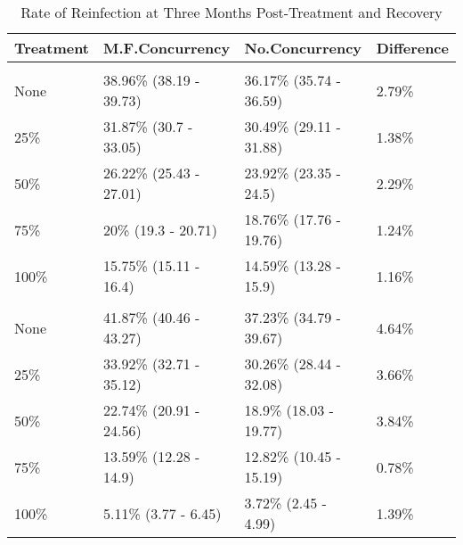 \documentclass [11pt, proquest] {uwthesis}[2015/03/03]
\begin{document}
\begin{table}

\caption{\label{tab:reinfs}Rate of Reinfection at Three Months Post-Treatment and Recovery}
\centering
\begin{tabular}[t]{llll}
\toprule
Treatment & M.F.Concurrency & No.Concurrency & Difference\\
\midrule
\addlinespace[0.3em]
\multicolumn{4}{l}{\textbf{Females}}\\
\hspace{1em}None & 38.96\% (38.19 - 39.73) & 36.17\% (35.74 - 36.59) & 2.79\%\\
\hspace{1em}25\% & 31.87\% (30.7 - 33.05) & 30.49\% (29.11 - 31.88) & 1.38\%\\
\hspace{1em}50\% & 26.22\% (25.43 - 27.01) & 23.92\% (23.35 - 24.5) & 2.29\%\\
\hspace{1em}75\% & 20\% (19.3 - 20.71) & 18.76\% (17.76 - 19.76) & 1.24\%\\
\hspace{1em}100\% & 15.75\% (15.11 - 16.4) & 14.59\% (13.28 - 15.9) & 1.16\%\\
\addlinespace[0.3em]
\multicolumn{4}{l}{\textbf{Males}}\\
\hspace{1em}None & 41.87\% (40.46 - 43.27) & 37.23\% (34.79 - 39.67) & 4.64\%\\
\hspace{1em}25\% & 33.92\% (32.71 - 35.12) & 30.26\% (28.44 - 32.08) & 3.66\%\\
\hspace{1em}50\% & 22.74\% (20.91 - 24.56) & 18.9\% (18.03 - 19.77) & 3.84\%\\
\hspace{1em}75\% & 13.59\% (12.28 - 14.9) & 12.82\% (10.45 - 15.19) & 0.78\%\\
\hspace{1em}100\% & 5.11\% (3.77 - 6.45) & 3.72\% (2.45 - 4.99) & 1.39\%\\
\bottomrule
\end{tabular}
\end{table}
\end{document}
